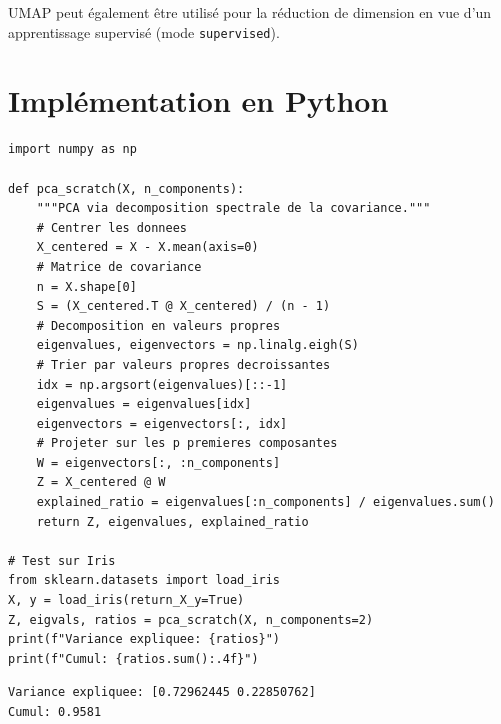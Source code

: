 \begin{remarque}
UMAP peut \'egalement \^etre utilis\'e pour la r\'eduction de dimension en vue
d'un apprentissage supervis\'e (mode \texttt{supervised}).
\end{remarque}

\section{Impl\'ementation en Python}
\label{sec:code-reduction}

\begin{codeblock}[title=\textbf{PCA from scratch}]
\begin{verbatim}
import numpy as np

def pca_scratch(X, n_components):
    """PCA via decomposition spectrale de la covariance."""
    # Centrer les donnees
    X_centered = X - X.mean(axis=0)
    # Matrice de covariance
    n = X.shape[0]
    S = (X_centered.T @ X_centered) / (n - 1)
    # Decomposition en valeurs propres
    eigenvalues, eigenvectors = np.linalg.eigh(S)
    # Trier par valeurs propres decroissantes
    idx = np.argsort(eigenvalues)[::-1]
    eigenvalues = eigenvalues[idx]
    eigenvectors = eigenvectors[:, idx]
    # Projeter sur les p premieres composantes
    W = eigenvectors[:, :n_components]
    Z = X_centered @ W
    explained_ratio = eigenvalues[:n_components] / eigenvalues.sum()
    return Z, eigenvalues, explained_ratio

# Test sur Iris
from sklearn.datasets import load_iris
X, y = load_iris(return_X_y=True)
Z, eigvals, ratios = pca_scratch(X, n_components=2)
print(f"Variance expliquee: {ratios}")
print(f"Cumul: {ratios.sum():.4f}")
\end{verbatim}
\end{codeblock}

\begin{codeoutput}
\begin{verbatim}
Variance expliquee: [0.72962445 0.22850762]
Cumul: 0.9581
\end{verbatim}
\end{codeoutput}

